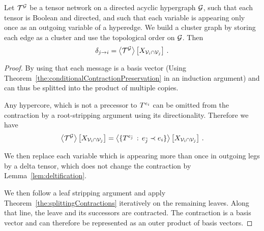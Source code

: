 \begin{theorem}
	Let $\mathcal{T}^{\mathcal{G}}$ be a tensor network on a directed acyclic hypergraph $\mathcal{G}$, such that each tensor is Boolean and directed, and such that each variable is appearing only once as an outgoing variable of a hyperedge.
	We build a cluster graph by storing each edge as a cluster and use the topological order on $\mathcal{G}$.
	Then
		\[ \delta_{j \rightarrow i} = \left\langle \mathcal{T}^{\mathcal{G}}\right\rangle \left[ X_{\mathcal{V}_i\cap\mathcal{V}_j} \right] \, . \]
\end{theorem}
\begin{proof}
	By using that each message is a basis vector (Using Theorem~\ref{the:conditionalContractionPreservation} in an induction argument) and can thus be splitted into the product of multiple copies.

	Any hypercore, which is not a precessor to $T^{e_{i}}$ can be omitted from the contraction by a root-stripping argument using its directionality.
	Therefore we have
	\begin{align*}
		\left\langle \mathcal{T}^{\mathcal{G}}\right\rangle \left[ X_{\mathcal{V}_i\cap\mathcal{V}_j} \right]
		= \left\langle \{T^{e_{\tilde{j}}} \, : \, e_{\tilde{j}} \prec e_{i} \}\right\rangle \left[ X_{\mathcal{V}_i\cap\mathcal{V}_j} \right] \, . 
	\end{align*}

	We then replace each variable which is appearing more than once in outgoing legs by a delta tensor, which does not change the contraction by Lemma~\ref{lem:deltification}.
	
	We then follow a leaf stripping argument and apply Theorem~\ref{the:splittingContractions} iteratively on the remaining leaves. 
	Along that line, the leave and its successors are contracted.
	The contraction is a basis vector and can therefore be represented as an outer product of basis vectors.

\end{proof}




